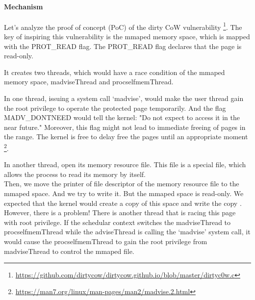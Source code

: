 \paragraph{Mechanism}
Let's analyze the proof of concept (PoC) of the dirty CoW \cite{8019988} vulnerability
\footnote{\url{https://github.com/dirtycow/dirtycow.github.io/blob/master/dirtyc0w.c}}.
The key of inspiring this vulnerability is the mmaped memory space, which is mapped with
the PROT\_READ flag. The PROT\_READ flag declares that the page is read-only.


It creates two threads, which would have a race condition of the mmaped memory space,
madviseThread and procselfmemThread.



In one thread, issuing a system call `madvise', would make the user thread gain the root
privilege to operate the protected page temporarily. And the flag MADV\_DONTNEED would
tell the kernel: "Do not expect to access it in the near future." Moreover,
this flag might not lead to immediate freeing of pages in the range. The kernel is free
to delay free the pages until an appropriate moment \footnote{\url{https://man7.org/linux/man-pages/man2/madvise.2.html}}.



In another thread, open its memory resource file. This file is a special file, which allows
the process to read its memory by itself.\\

Then, we move the printer of file descriptor of the memory resource file to the mmaped
space. And we try to write it. But the mmaped space is read-only. We expected that the
kernel would create a copy of this space and write the copy \cite{8001953}.\\


However, there is a problem! There is another thread that is racing this page with root
privilege. If the schedular context switches the madviseThread to procselfmemThread while
the adviseThread is calling the `madvise' system call, it would cause the
procselfmemThread to gain the root privilege from madviseThread to control the mmaped file.


